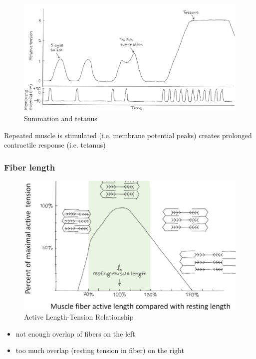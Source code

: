 \documentclass[11pt,fleqn]{book} %
\begin{document}
\begin{figure}[h!]
\begin{center}
    \includegraphics[width=0.65\linewidth]{Pictures/Screenshot 2024-04-03 225826.png}
    \caption{Summation and tetanus}
\end{center}
\end{figure}


\begin{remark}
    Repeated muscle is stimulated (i.e.
membrane potential peaks) creates
prolonged contractile response (i.e.
tetanus)
\end{remark}

\subsubsection{Fiber length}
\begin{figure}[h!]
\begin{center}
    \includegraphics[width=0.4\linewidth]{Pictures/Screenshot 2024-04-03 232654.png}
    \caption{Active Length-Tension Relationship}
\end{center}
\end{figure}


\begin{remark}
    \begin{itemize}
        \item not enough overlap of fibers on the left
        \item too much overlap (resting tension in fiber) on the right
    \end{itemize}
\end{remark}
\end{document}
